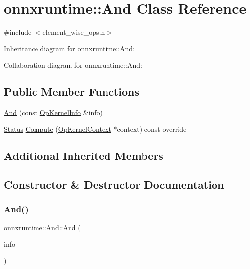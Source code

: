 \hypertarget{classonnxruntime_1_1And}{}\section{onnxruntime\+:\+:And Class Reference}
\label{classonnxruntime_1_1And}


{\ttfamily \#include $<$element\+\_\+wise\+\_\+ops.\+h$>$}



Inheritance diagram for onnxruntime\+:\+:And\+:


Collaboration diagram for onnxruntime\+:\+:And\+:
\subsection*{Public Member Functions}
\begin{DoxyCompactItemize}
\item 
\mbox{\hyperlink{classonnxruntime_1_1And_a2c83b3b6a72ddc384ece9954fa5d47f7}{And}} (const \mbox{\hyperlink{classonnxruntime_1_1OpKernelInfo}{Op\+Kernel\+Info}} \&info)
\item 
\mbox{\hyperlink{classonnxruntime_1_1common_1_1Status}{Status}} \mbox{\hyperlink{classonnxruntime_1_1And_a4d9213701e71e8e4e17255160b936350}{Compute}} (\mbox{\hyperlink{classonnxruntime_1_1OpKernelContext}{Op\+Kernel\+Context}} $\ast$context) const override
\end{DoxyCompactItemize}
\subsection*{Additional Inherited Members}


\subsection{Constructor \& Destructor Documentation}
\mbox{\label{classonnxruntime_1_1And_a2c83b3b6a72ddc384ece9954fa5d47f7}} 
\subsubsection{\texorpdfstring{And()}{And()}}
{\footnotesize\ttfamily onnxruntime\+::\+And\+::\+And (\begin{DoxyParamCaption}\item[{const \mbox{\hyperlink{classonnxruntime_1_1OpKernelInfo}{Op\+Kernel\+Info}} \&}]{info }\end{DoxyParamCaption})\hspace{0.3cm}{\ttfamily [inline]}}



